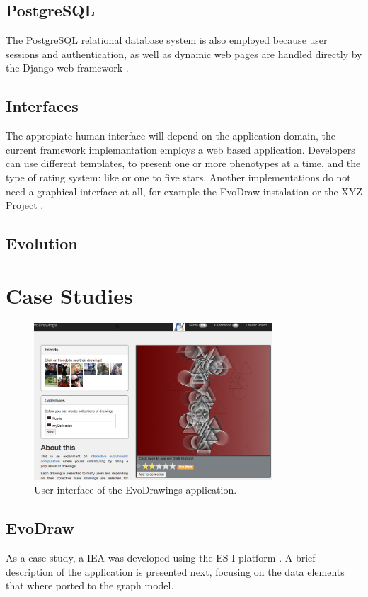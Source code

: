 \subsection{PostgreSQL}
  The PostgreSQL relational database system is also employed because user sessions and authentication,
  as well as dynamic web pages are handled directly by the Django web
  framework \cite{garcia2013evospace}. %

\subsection{Interfaces}
The appropiate human interface will depend on the application domain, the current framework implemantation  
employs a web based application. Developers can use different templates, to present one or more phenotypes 
at a time, and the type of rating system: like or one to five stars. Another implementations do not need a
graphical interface at all, for example the EvoDraw instalation or the XYZ Project \cite{de2014artists}.   
    
\subsection{Evolution}

\section{Case Studies}
\label{sec:experiments}

\begin{figure}[!t]
    \centering
        \includegraphics[width=3.5in]{img/interface.png}
    \caption{User interface of the EvoDrawings application.}
    \label{fig:web}
\end{figure}

\subsection{EvoDraw}
As a case study, a IEA was developed using the 
ES-I platform \cite{garcia2013evospace}.
A brief description of the application is presented next, focusing
on the data elements that where ported to the graph model.

